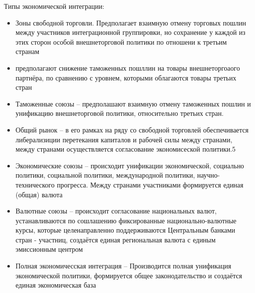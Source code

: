 \documentclass[12pt,a4paper]{book}
\begin{document}
Типы экономической интеграции:
\begin{itemize}
	\item Зоны свободной торговли. Предполагает взаимную отмену торговых пошлин между участников интеграционной группировки, но сохранение у каждой из этих сторон особой внешнеторговой политики по отношени к третьим странам
	\item предполагают снижение таможенных пошллин на товары внешнеторгоаого партнёра, по сравнению с уровнем, которыми облагаются товары третьих стран
	\item Таможенные союзы -- предполашают взаимную отмену таможенных пошлин и унификацию внешнеторговой политики, относительно третьих стран.
	\item Общий рынок -- в его рамках на ряду со свободной торговлей обеспечивается либерализиции перетекания капиталов и рабочей силы между странами, между странами осуществляется согласование экономисеской политики.5
	\item Экономические союзы -- происходит унификации экономической, социально политики, социальной политики, международной политики, научно-технического прогресса. Между странами участниками формируется единая (общая) валюта
	\item Валютные союзы -- происходит согласование национальных валют, устанавливаются по сошлашению фиксированные национально-валютные курсы, которые целенаправленно поддерживаются Центральным банками стран - участниц, создаётся единая региональная валюта с единым эмиссионным центром
	\item Полная экономичесская интеграция -- Производится полная унификация экономической политики, формируется общее законодательство и создаётся единая экономическая база
\end{itemize}
\end{document}
